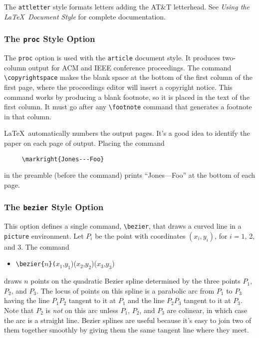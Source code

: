 The {\tt attletter} style formats letters adding the AT\&T letterhead.
See {\it Using the \LaTeX\ Document Style}\cite{bib:tmdoc} for complete
documentation. 

\subsubsection{The {\tt proc} Style Option}

The {\tt proc} option is used with the \mbox{\tt article} document
style.  It produces two-column output for ACM and IEEE conference
proceedings.  The command \hbox{\verb|\copyrightspace|} makes the blank
space at the bottom of the first column of the first page, where the
proceedings editor will insert a copyright notice.  This command works
by producing a blank footnote, so it is placed in the text of the first
column.  It must go after any \hbox{\verb|\footnote|} command that
generates a footnote in that column.

\LaTeX\ automatically numbers the output pages.  It's a good idea 
to identify the paper on each page of output.  Placing the command
\begin{verbatim}
     \markright{Jones---Foo}
\end{verbatim}
in the preamble (before the \hbox{\verb||} command)
prints ``Jones---Foo'' at the bottom of each page.  

\subsubsection{The {\tt bezier} Style Option}

This option defines a single command, \hbox{\verb|\bezier|}, that draws
a curved line in a {\tt picture} environment.  Let $P_{i}$ be the point
with coordinates $(x_{i},y_{i})$, for $i=1$, 2, and 3.  The command
\begin{itemize} \tt
\item[]
\verb|\bezier{|$n$\verb|}(|$x_{1}$,$y_{1}$)($x_{2}$,$y_{2}$)($x_{3}$,$y_{3}$)
\end{itemize}
draws $n$ points on the quadratic Bezier spline determined by the three
points $P_{1}$, $P_{2}$, and $P_{3}$.  The locus of points on this
spline is a parabolic arc from $P_{1}$ to $P_{3}$ having the line
$P_{1}P_{2}$ tangent to it at $P_{1}$ and the line $P_{2}P_{3}$ tangent
to it at $P_{3}$.  Note that $P_{2}$ is {\em not\/} on this arc unless
$P_{1}$, $P_{2}$, and $P_{3}$ are colinear, in which case the arc is a
straight line.  Bezier splines are useful because it's easy to join two
of them together smoothly by giving them the same tangent line where
they meet.

